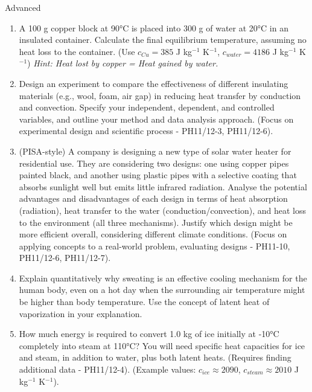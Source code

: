 \begin{tieredquestions}{Advanced}
\begin{enumerate}
    \item A 100 g copper block at 90°C is placed into 300 g of water at 20°C in an insulated container. Calculate the final equilibrium temperature, assuming no heat loss to the container. (Use \(c_{Cu} = 385\) J kg\(^{-1}\) K\(^{-1}\), \(c_{water} = 4186\) J kg\(^{-1}\) K\(^{-1}\)) \textit{Hint: Heat lost by copper = Heat gained by water.}
    \item Design an experiment to compare the effectiveness of different insulating materials (e.g., wool, foam, air gap) in reducing heat transfer by conduction and convection. Specify your independent, dependent, and controlled variables, and outline your method and data analysis approach. (Focus on experimental design and scientific process - PH11/12-3, PH11/12-6).
    \item (PISA-style) A company is designing a new type of solar water heater for residential use. They are considering two designs: one using copper pipes painted black, and another using plastic pipes with a selective coating that absorbs sunlight well but emits little infrared radiation. Analyse the potential advantages and disadvantages of each design in terms of heat absorption (radiation), heat transfer to the water (conduction/convection), and heat loss to the environment (all three mechanisms). Justify which design might be more efficient overall, considering different climate conditions. (Focus on applying concepts to a real-world problem, evaluating designs - PH11-10, PH11/12-6, PH11/12-7).
    \item Explain quantitatively why sweating is an effective cooling mechanism for the human body, even on a hot day when the surrounding air temperature might be higher than body temperature. Use the concept of latent heat of vaporization in your explanation.
    \item How much energy is required to convert 1.0 kg of ice initially at -10°C completely into steam at 110°C? You will need specific heat capacities for ice and steam, in addition to water, plus both latent heats. (Requires finding additional data - PH11/12-4). (Example values: \(c_{ice} \approx 2090\), \(c_{steam} \approx 2010\) J kg\(^{-1}\) K\(^{-1}\)).
\end{enumerate}
\end{tieredquestions}

\FloatBarrier %

